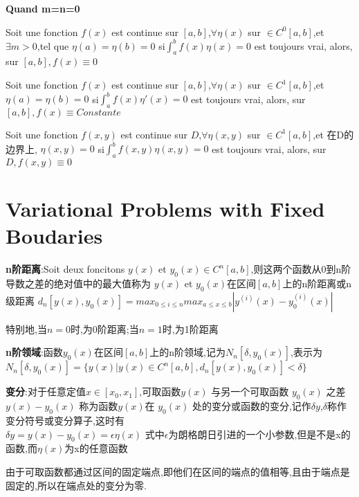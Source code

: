 \documentclass{book}
\begin{document}
\textbf{Quand m=n=0}
\begin{theorem}
    Soit une fonction $f(x)$ est continue sur $[a,b]$,$ \forall \eta(x)$ sur $\in C^{0}[a,b]$,et $\exists m>0$,tel que $\eta(a)=\eta(b)=0$ \newline
    si$ \int_{a}^{b}f(x)\eta(x)=0$ est toujours vrai, \newline
    alors, sur $[a,b],f(x)\equiv 0$
\end{theorem}

\begin{theorem}
    Soit une fonction $f(x)$ est continue sur $[a,b]$,$ \forall \eta(x)$ sur $\in C^{1}[a,b]$,et $\eta(a)=\eta(b)=0$ \newline
    si$ \int_{a}^{b}f(x)\eta'(x)=0$ est toujours vrai, \newline
    alors, sur $[a,b],f(x)\equiv Constante$
\end{theorem}

\begin{theorem}
    Soit une fonction $f(x,y)$ est continue sur $D$,$ \forall \eta(x,y)$ sur $\in C^{1}[a,b]$,et 在D的边界上, $\eta(x,y)=0$\newline
    si$ \int_{a}^{b}f(x,y)\eta(x,y)=0$ est toujours vrai, \newline
    alors, sur $D,f(x,y)\equiv 0$
\end{theorem}

\section{Variational Problems with Fixed Boudaries}
\begin{definition}
  \textbf{n阶距离}:Soit deux foncitons $y(x)$ et $y_0(x)\in C^{n}[a,b]$,则这两个函数从0到n阶导数之差的绝对值中的最大值称为 $y(x)$ et $y_0(x)$在区间$[a,b]$上的n阶距离或n级距离
  $d_n[y(x),y_0(x)]=max_{0 \leqslant i \leqslant n}max_{a \leqslant x \leqslant b}|y^{(i)}(x)-y_0^{(i)}(x)|$
\end{definition}
特别地,当$n=0$时,为0阶距离;当$n=1$时,为1阶距离

\begin{definition}
\textbf{n阶领域}:函数$y_0(x)$在区间$[a,b]$上的n阶领域,记为$N_n[\delta,y_0(x)]$,表示为\newline
$N_n[\delta,y_0(x)]=\{y(x)|y(x)\in C^{n}[a,b],d_n[y(x),y_0(x)] < \delta \}$
\end{definition}
\begin{definition}
\textbf{变分}:对于任意定值$x \in [x_0,x_1]$,可取函数$y(x)$ 与另一个可取函数 $y_0(x)$ 之差$y(x)-y_0(x)$ 称为函数$y(x)$在 $y_0(x)$ 处的变分或函数的变分,记作$\delta y$,$\delta$称作变分符号或变分算子,这时有\\
$\delta y=y(x)-y_0(x)=\epsilon\eta(x)$ \newline
式中$\epsilon$为朗格朗日引进的一个小参数,但是不是x的函数,而$\eta(x)$为x的任意函数
\end{definition}
由于可取函数都通过区间的固定端点,即他们在区间的端点的值相等,且由于端点是固定的,所以在端点处的变分为零. \newline
\end{document}
